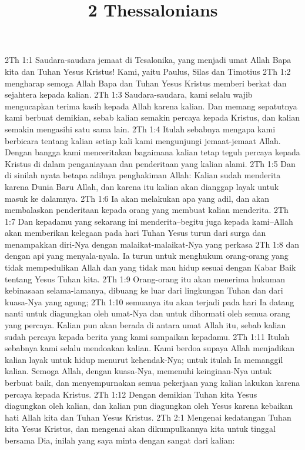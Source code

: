 

\title{2 Thessalonians}

2Th 1:1  Saudara-saudara jemaat di Tesalonika, yang menjadi umat Allah Bapa kita dan Tuhan Yesus Kristus! Kami, yaitu Paulus, Silas dan Timotius
2Th 1:2  mengharap semoga Allah Bapa dan Tuhan Yesus Kristus memberi berkat dan sejahtera kepada kalian.
2Th 1:3  Saudara-saudara, kami selalu wajib mengucapkan terima kasih kepada Allah karena kalian. Dan memang sepatutnya kami berbuat demikian, sebab kalian semakin percaya kepada Kristus, dan kalian semakin mengasihi satu sama lain.
2Th 1:4  Itulah sebabnya mengapa kami berbicara tentang kalian setiap kali kami mengunjungi jemaat-jemaat Allah. Dengan bangga kami menceritakan bagaimana kalian tetap teguh percaya kepada Kristus di dalam penganiayaan dan penderitaan yang kalian alami.
2Th 1:5  Dan di sinilah nyata betapa adilnya penghakiman Allah: Kalian sudah menderita karena Dunia Baru Allah, dan karena itu kalian akan dianggap layak untuk masuk ke dalamnya.
2Th 1:6  Ia akan melakukan apa yang adil, dan akan membalaskan penderitaan kepada orang yang membuat kalian menderita.
2Th 1:7  Dan kepadamu yang sekarang ini menderita--begitu juga kepada kami--Allah akan memberikan kelegaan pada hari Tuhan Yesus turun dari surga dan menampakkan diri-Nya dengan malaikat-malaikat-Nya yang perkasa
2Th 1:8  dan dengan api yang menyala-nyala. Ia turun untuk menghukum orang-orang yang tidak mempedulikan Allah dan yang tidak mau hidup sesuai dengan Kabar Baik tentang Yesus Tuhan kita.
2Th 1:9  Orang-orang itu akan menerima hukuman kebinasaan selama-lamanya, dibuang ke luar dari lingkungan Tuhan dan dari kuasa-Nya yang agung;
2Th 1:10  semuanya itu akan terjadi pada hari Ia datang nanti untuk diagungkan oleh umat-Nya dan untuk dihormati oleh semua orang yang percaya. Kalian pun akan berada di antara umat Allah itu, sebab kalian sudah percaya kepada berita yang kami sampaikan kepadamu.
2Th 1:11  Itulah sebabnya kami selalu mendoakan kalian. Kami berdoa supaya Allah menjadikan kalian layak untuk hidup menurut kehendak-Nya; untuk itulah Ia memanggil kalian. Semoga Allah, dengan kuasa-Nya, memenuhi keinginan-Nya untuk berbuat baik, dan menyempurnakan semua pekerjaan yang kalian lakukan karena percaya kepada Kristus.
2Th 1:12  Dengan demikian Tuhan kita Yesus diagungkan oleh kalian, dan kalian pun diagungkan oleh Yesus karena kebaikan hati Allah kita dan Tuhan Yesus Kristus.
2Th 2:1  Mengenai kedatangan Tuhan kita Yesus Kristus, dan mengenai akan dikumpulkannya kita untuk tinggal bersama Dia, inilah yang saya minta dengan sangat dari kalian:

